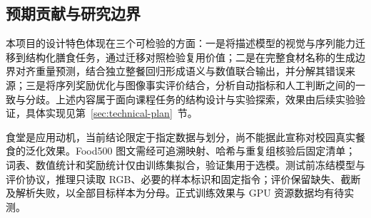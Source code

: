 \subsection{预期贡献与研究边界}
本项目的设计特色体现在三个可检验的方面：一是将描述模型的视觉与序列能力迁移到结构化膳食任务，通过迁移对照检验复用价值；二是在完整食材名称的生成边界对齐重量预测，结合独立整餐回归形成语义与数值联合输出，并分解其错误来源；三是将序列奖励优化与图像事实评价结合，分析自动指标和人工判断之间的一致与分歧。上述内容属于面向课程任务的结构设计与实验探索，效果由后续实验验证，具体实现见第~\ref{sec:technical-plan}~节。

食堂是应用动机，当前结论限定于指定数据与划分，尚不能据此宣称对校园真实餐食的泛化效果。Food500 图文需经可追溯映射、哈希与重复组核验后固定清单；词表、数值统计和奖励统计仅由训练集拟合，验证集用于选模。测试前冻结模型与评价协议，推理只读取 RGB、必要的样本标识和固定指令；评价保留缺失、截断及解析失败，以全部目标样本为分母。正式训练效果与 GPU 资源数据均有待实测。

